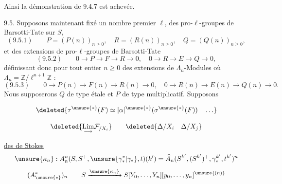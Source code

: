 Ainsi la démonstration de 9.4.7 est achevée.

9.5. Supposons maintenant fixé un nombre premier $\ell$, des pro-$\ell$-groupes de Barsotti-Tate sur $S$,
\[
(9.5.1)\qquad P=(P(n))_{n\geq0},\quad R=(R(n))_{n\geq0},\quad Q=(Q(n))_{n\geq0},
\]
et des extensions de pro-$\ell$-groupes de Barsotti-Tate
\[
(9.5.2)\qquad 0\longrightarrow P\longrightarrow F\longrightarrow R\longrightarrow0,\quad
0\longrightarrow R\longrightarrow E\longrightarrow Q\longrightarrow0,
\]
définissant donc pour tout entier $n\geq0$ des extensions de $\Lambda_n$-Modules où $\Lambda_n=\mathbb Z/\ell^{n+1}\mathbb Z$ :
\[
(9.5.3)\qquad 0\longrightarrow P(n)\longrightarrow F(n)\longrightarrow R(n)\longrightarrow0,\quad
0\longrightarrow R(n)\longrightarrow E(n)\longrightarrow Q(n)\longrightarrow0.
\]
Nous supposerons $Q$ de type étale et $P$ de type multiplicatif. Supposons


\[
\deleted{\tau^{\unsure{*}}(F)\simeq|\alpha|^{\unsure{*}}(\sigma^{\unsure{*}}(F))\quad\ldots}
\]

\[
\deleted{\underset{\longrightarrow}{\operatorname{Lim}}\mathcal F_{/X_i}}
\qquad
\deleted{\Delta/X_i\quad\Delta/X_j}
\]

\uline{ des  de Stokes}
\[
\unsure{\kappa_n}:A_n^n(S,S^+,\unsure{\gamma_*^*|\gamma_*},t)(k')
=\widehat A_n(S^{k'},(S^{k'})^+,\gamma_*^{k'},t^{k'})^n
\]
\[
 (A^{*}_{\unsure{*}})_n\qquad
 S\xrightarrow{\unsure{\kappa_n}}S[Y_0,\ldots,Y_n][y_0,\ldots,y_n]^{\unsure{(n)}}
\]

